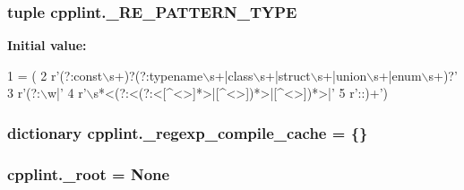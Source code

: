 \subsubsection[{\texorpdfstring{\+\_\+\+R\+E\+\_\+\+P\+A\+T\+T\+E\+R\+N\+\_\+\+T\+Y\+PE}{_RE_PATTERN_TYPE}}]{\setlength{\rightskip}{0pt plus 5cm}tuple cpplint.\+\_\+\+R\+E\+\_\+\+P\+A\+T\+T\+E\+R\+N\+\_\+\+T\+Y\+PE\hspace{0.3cm}{\ttfamily [private]}}\hypertarget{namespacecpplint_afedcf56f0eede3aa5608cbcfd09f56e1}{}\label{namespacecpplint_afedcf56f0eede3aa5608cbcfd09f56e1}
{\bfseries Initial value\+:}
\begin{DoxyCode}
1 = (
2     \textcolor{stringliteral}{r'(?:const\(\backslash\)s+)?(?:typename\(\backslash\)s+|class\(\backslash\)s+|struct\(\backslash\)s+|union\(\backslash\)s+|enum\(\backslash\)s+)?'}
3     \textcolor{stringliteral}{r'(?:\(\backslash\)w|'}
4     \textcolor{stringliteral}{r'\(\backslash\)s*<(?:<(?:<[^<>]*>|[^<>])*>|[^<>])*>|'}
5     \textcolor{stringliteral}{r'::)+'})
\end{DoxyCode}
\subsubsection[{\texorpdfstring{\+\_\+regexp\+\_\+compile\+\_\+cache}{_regexp_compile_cache}}]{\setlength{\rightskip}{0pt plus 5cm}dictionary cpplint.\+\_\+regexp\+\_\+compile\+\_\+cache = \{\}\hspace{0.3cm}{\ttfamily [private]}}\hypertarget{namespacecpplint_af7e2f028042409f5aa8cfc52f283d134}{}\label{namespacecpplint_af7e2f028042409f5aa8cfc52f283d134}
\subsubsection[{\texorpdfstring{\+\_\+root}{_root}}]{\setlength{\rightskip}{0pt plus 5cm}cpplint.\+\_\+root = None\hspace{0.3cm}{\ttfamily [private]}}\hypertarget{namespacecpplint_aaf6dcfd2e05bfc2a4ec4f758e05d45e2}{}\label{namespacecpplint_aaf6dcfd2e05bfc2a4ec4f758e05d45e2}
